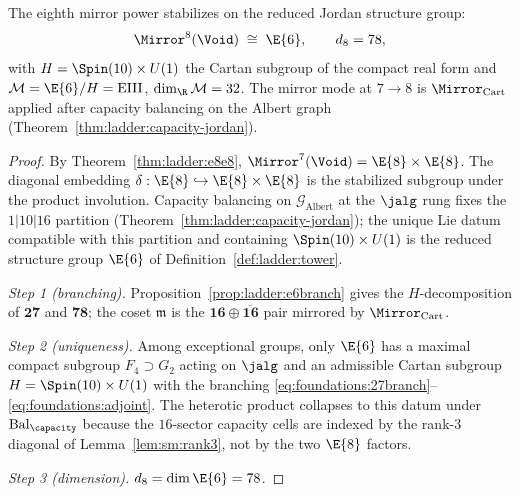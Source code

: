 \begin{theorem}[Exceptional rung $n=8$]\label{thm:ladder:e6}
The eighth mirror power stabilizes on the reduced Jordan structure group:
\begin{equation}\label{eq:ladder:mirror8}
  \Mirror^8(\Void)\;\cong\;\E{6},
  \qquad d_8=78,
\end{equation}
with $H=\Spin(10)\times U(1)$ the Cartan subgroup of the compact real form and
$\mathcal{M}=\E{6}/H=\mathrm{EIII}$, $\dim_{\R}\mathcal{M}=32$. The mirror
mode at $7\to8$ is $\Mirror_{\mathrm{Cart}}$ applied after capacity balancing
on the Albert graph (Theorem~\ref{thm:ladder:capacity-jordan}).
\end{theorem}

\begin{proof}
By Theorem~\ref{thm:ladder:e8e8}, $\Mirror^7(\Void)=\E{8}\times\E{8}$. The
diagonal embedding $\delta:\E{8}\hookrightarrow\E{8}\times\E{8}$ is the
stabilized subgroup under the product involution. Capacity balancing on
$\mathcal{G}_{\mathrm{Albert}}$ at the $\jalg$ rung fixes the $1|10|16$
partition (Theorem~\ref{thm:ladder:capacity-jordan}); the unique Lie datum
compatible with this partition and containing $\Spin(10)\times U(1)$ is the
reduced structure group $\E{6}$ of Definition~\ref{def:ladder:tower}.

\emph{Step 1 (branching).}
Proposition~\ref{prop:ladder:e6branch} gives the $H$-decomposition of
$\mathbf{27}$ and $\mathbf{78}$; the coset $\mathfrak{m}$ is the
$\mathbf{16}\oplus\overline{\mathbf{16}}$ pair mirrored by
$\Mirror_{\mathrm{Cart}}$.

\emph{Step 2 (uniqueness).}
Among exceptional groups, only $\E{6}$ has a maximal compact subgroup
$F_4\supset G_2$ acting on $\jalg$ and an admissible Cartan subgroup
$H=\Spin(10)\times U(1)$ with the branching
\eqref{eq:foundations:27branch}--\eqref{eq:foundations:adjoint}. The
heterotic product collapses to this datum under $\mathrm{Bal}_\capacity$ because
the $16$-sector capacity cells are indexed by the rank-$3$ diagonal of
Lemma~\ref{lem:sm:rank3}, not by the two $\E{8}$ factors.

\emph{Step 3 (dimension).}
$d_8=\dim\E{6}=78$.
\end{proof}

